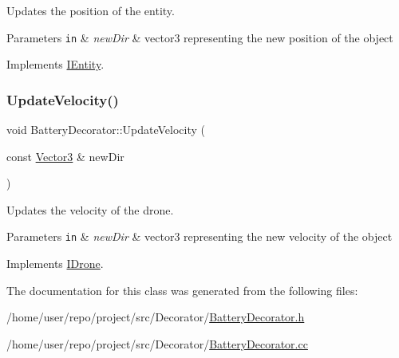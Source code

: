 Updates the position of the entity. 


\begin{DoxyParams}[1]{Parameters}
\mbox{\tt in}  & {\em new\+Dir} & vector3 representing the new position of the object \\
\hline
\end{DoxyParams}


Implements \hyperlink{classIEntity_ad30f6845c8747534e7607ca97addbdc6}{I\+Entity}.

\mbox{\label{classBatteryDecorator_aad635fd483288cdcc46892da5265ca49}} 
\subsubsection{\texorpdfstring{Update\+Velocity()}{UpdateVelocity()}}
{\footnotesize\ttfamily void Battery\+Decorator\+::\+Update\+Velocity (\begin{DoxyParamCaption}\item[{const \hyperlink{classVector3}{Vector3} \&}]{new\+Dir }\end{DoxyParamCaption})\hspace{0.3cm}{\ttfamily [virtual]}}



Updates the velocity of the drone. 


\begin{DoxyParams}[1]{Parameters}
\mbox{\tt in}  & {\em new\+Dir} & vector3 representing the new velocity of the object \\
\hline
\end{DoxyParams}


Implements \hyperlink{classIDrone_a5cc88b8205adaeea8f71c822d08e1607}{I\+Drone}.



The documentation for this class was generated from the following files\+:\begin{DoxyCompactItemize}
\item 
/home/user/repo/project/src/\+Decorator/\hyperlink{BatteryDecorator_8h}{Battery\+Decorator.\+h}\item 
/home/user/repo/project/src/\+Decorator/\hyperlink{BatteryDecorator_8cc}{Battery\+Decorator.\+cc}\end{DoxyCompactItemize}
